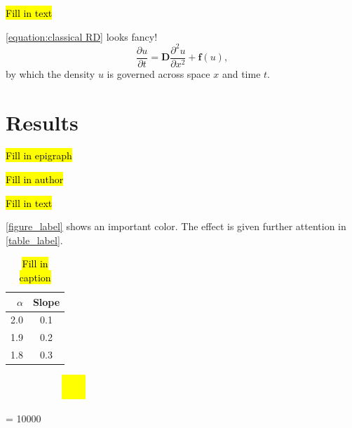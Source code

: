 \documentclass[oneside]{book}
\begin{document}
\hl{Fill in text}

\autoref{equation:classical RD} looks fancy!
\begin{equation}
\label{equation:classical RD}
\dfrac{\partial u}{\partial t} = \mathbf{D}\dfrac{\partial ^2 u}{\partial x^2} + \mathbf{f}(u),
\end{equation}
by which the density $u$ is governed across space $x$ and time $t$.

\chaptercloser

\chapter{Results}
\label{chap:results}

\label{chap:introduction}
\epigraph{\hl{Fill in epigraph}}{\hl{Fill in author}}

\hl{Fill in text}


\autoref{figure_label} shows an important color.
The effect is given further attention in \autoref{table_label}.

\begin{table}
\centering
\caption{\hl{Fill in caption}}
\bgroup
\def\arraystretch{1.5}
\begin{tabular}{r|c}
$\alpha$	& Slope	\\
\hline
2.0 & 0.1 \\
1.9 & 0.2 \\
1.8 & 0.3 \\
\end{tabular}
\egroup
\label{table_label}
\end{table}

\begin{figure}
\centering
\caption{
\hl{Fill in caption}
}
\begin{subfigure}{1.0\textwidth}
\centering
\includegraphics[clip, trim = 0.5cm 0.5cm 0.5cm 0.5cm, width = 0.1\textwidth]{image.png}
\end{subfigure}
\label{figure_label}
\end{figure}

\clearpage
\interlinepenalty = 10000 %



\clearpage
{}

\end{document}
